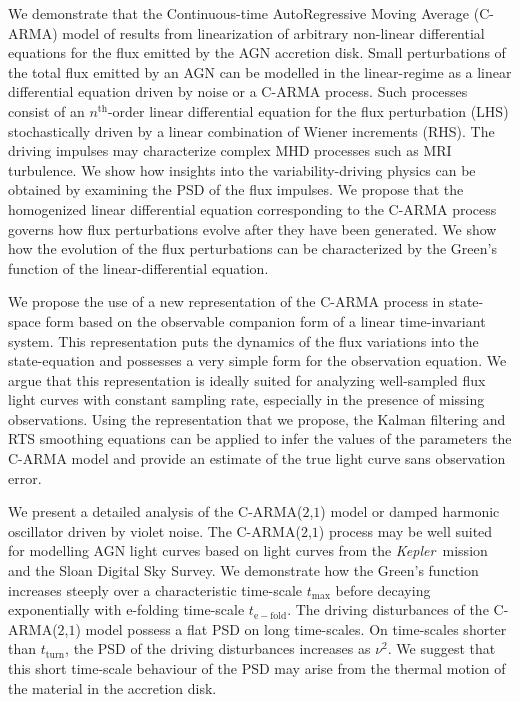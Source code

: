 \documentclass[a4paper,fleqn,usenatbib]{mnras}
\newcommand{\Kepler}{\textit{Kepler~}}
\begin{document}
We demonstrate that the Continuous-time AutoRegressive Moving Average (C-ARMA) model of \citet{Kelly14} results from linearization of arbitrary non-linear differential equations for the flux emitted by the AGN accretion disk. Small perturbations of the total flux emitted by an AGN can be modelled in the linear-regime as a linear differential equation driven by noise or a C-ARMA process. Such processes consist of an $n^{\mathrm{th}}$-order linear differential equation for the flux perturbation (LHS) stochastically driven by a linear combination of Wiener increments (RHS). The driving impulses may characterize complex MHD processes such as MRI turbulence. We show how insights into the variability-driving physics can be obtained by examining the PSD of the flux impulses. We propose that the homogenized linear differential equation corresponding to the C-ARMA process governs how flux perturbations evolve after they have been generated. We show how the evolution of the flux perturbations can be characterized by the Green's function of the linear-differential equation.

We propose the use of a new representation of the C-ARMA process in state-space form based on the observable companion form of a linear time-invariant system. This representation puts the dynamics of the flux variations into the state-equation and possesses a very simple form for the observation equation. We argue that this representation is ideally suited for analyzing well-sampled flux light curves with constant sampling rate, especially in the presence of missing observations. Using the representation that we propose, the Kalman filtering and RTS smoothing equations can be applied to infer the values of the parameters the C-ARMA model and provide an estimate of the true light curve sans observation error.

We present a detailed analysis of the C-ARMA($2$,$1$) model or damped harmonic oscillator driven by violet noise. The C-ARMA($2$,$1$) process may be well suited for modelling AGN light curves based on light curves from the \Kepler mission and the Sloan Digital Sky Survey. We demonstrate how the Green's function increases steeply over a characteristic time-scale $t_{\mathrm{max}}$ before decaying exponentially with e-folding time-scale $t_{\mathrm{e-fold}}$. The driving disturbances of the C-ARMA($2$,$1$) model possess a flat PSD on long time-scales. On time-scales shorter than $t_{\mathrm{turn}}$, the PSD of the driving disturbances increases as $\nu^{2}$. We suggest that this short time-scale behaviour of the PSD may arise from the thermal motion of the material in the accretion disk.
\end{document}
